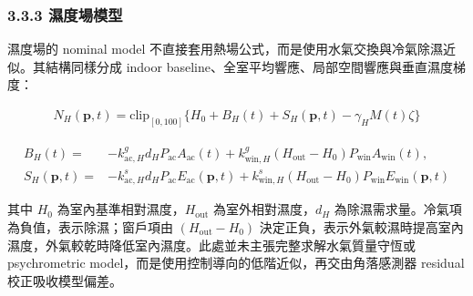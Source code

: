 \documentclass[12pt,a4paper]{article}
\begin{document}
\subsubsection*{3.3.3 濕度場模型}

濕度場的 nominal model 不直接套用熱場公式，而是使用水氣交換與冷氣除濕近似。其結構同樣分成 indoor baseline、全室平均響應、局部空間響應與垂直濕度梯度：


\[
\begin{aligned}N_H(\mathbf{p},t)=\mathrm{clip}_{[0,100]}\{H_0+B_H(t)+S_H(\mathbf{p},t)-\gamma_H M(t)\zeta\}\end{aligned}
\]

\[
\begin{aligned}B_H(t)=&-k_{\mathrm{ac},H}^{g}d_HP_{\mathrm{ac}}A_{\mathrm{ac}}(t)+k_{\mathrm{win},H}^{g}(H_{\mathrm{out}}-H_0)P_{\mathrm{win}}A_{\mathrm{win}}(t),\\S_H(\mathbf{p},t)=&-k_{\mathrm{ac},H}^{s}d_HP_{\mathrm{ac}}E_{\mathrm{ac}}(\mathbf{p},t)+k_{\mathrm{win},H}^{s}(H_{\mathrm{out}}-H_0)P_{\mathrm{win}}E_{\mathrm{win}}(\mathbf{p},t)\end{aligned}
\]

其中 $H_0$ 為室內基準相對濕度，$H_{\mathrm{out}}$ 為室外相對濕度，$d_H$ 為除濕需求量。冷氣項為負值，表示除濕；窗戶項由 $(H_{\mathrm{out}}-H_0)$ 決定正負，表示外氣較濕時提高室內濕度，外氣較乾時降低室內濕度。此處並未主張完整求解水氣質量守恆或 psychrometric model，而是使用控制導向的低階近似，再交由角落感測器 residual 校正吸收模型偏差。
\end{document}
